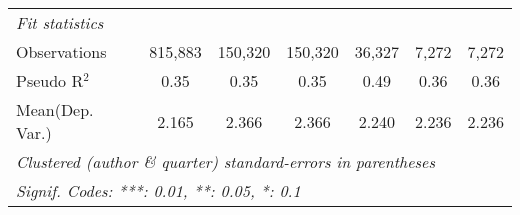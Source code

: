 \begin{tabular}{lcccccc}
   \midrule
   \emph{Fit statistics}\\
   Observations            & 815,883 & 150,320 & 150,320 & 36,327  & 7,272         & 7,272\\  
   Pseudo R$^2$            & 0.35    & 0.35    & 0.35    & 0.49    & 0.36          & 0.36\\  
Mean(Dep. Var.) & 2.165 & 2.366 & 2.366 & 2.240 & 2.236 & 2.236 \\
   \midrule \midrule
   \multicolumn{7}{l}{\emph{Clustered (author \& quarter) standard-errors in parentheses}}\\
   \multicolumn{7}{l}{\emph{Signif. Codes: ***: 0.01, **: 0.05, *: 0.1}}\\
\end{tabular}
\par\endgroup
